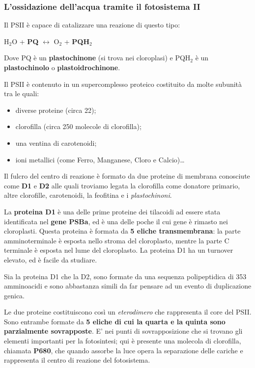 \documentclass[]{article}
\begin{document}
\subsubsection{L'ossidazione dell'acqua tramite il fotosistema
II}\label{lossidazione-dellacqua-tramite-il-fotosistema-ii}

Il PSII è capace di catalizzare una reazione di questo tipo:

H$_2$O + \textbf{PQ} $\leftrightarrow$ O$_2$ + \textbf{PQH$_2$}

Dove PQ è un \textbf{plastochinone} (si trova nei cloroplasi) e PQH$_2$
è un \textbf{plastochinolo} o \textbf{plastoidrochinone}.

Il PSII è contenuto in un supercomplesso proteico costituito da molte
subunità tra le quali:

\begin{itemize}
\itemsep1pt\parskip0pt
\item
  diverse proteine (circa 22);
\item
  clorofilla (circa 250 molecole di clorofilla);
\item
  una ventina di carotenoidi;
\item
  ioni metallici (come Ferro, Manganese, Cloro e Calcio)\ldots{}
\end{itemize}

Il fulcro del centro di reazione è formato da due proteine di membrana
conosciute come \textbf{D1} e \textbf{D2} alle quali troviamo legata la
clorofilla come donatore primario, altre clorofille, carotenoidi, la
feofitina e i \emph{plastochinoni}.

La \textbf{proteina D1} è una delle prime proteine dei tilacoidi ad
essere stata identificata nel \textbf{gene PSBa}, ed è una
delle poche il cui gene è rimasto nei cloroplasti. Questa proteina è
formata da \textbf{5 eliche transmembrana}: la parte amminoterminale è
esposta nello stroma del cloroplasto, mentre la parte C terminale è
esposta nel lume del cloroplasto. La proteina D1 ha un turnover elevato,
ed è facile da studiare.

Sia la proteina D1 che la D2, sono formate da una sequenza polipeptidica
di 353 amminoacidi e sono abbastanza simili da far pensare ad un evento
di duplicazione genica.

Le due proteine costituiscono così un \emph{eterodimero} che rappresenta
il core del PSII. Sono entrambe formate da \textbf{5 eliche di cui la
quarta e la quinta sono parzialmente sovrapposte}. E' nei punti di
sovrapposizione che si trovano gli elementi importanti per la
fotosintesi; qui è presente una molecola di clorofilla, chiamata
\textbf{P680}, che quando assorbe la luce opera la separazione delle
cariche e rappresenta il centro di reazione del fotosistema.
\end{document}
